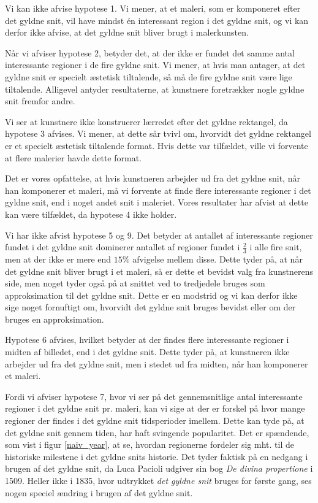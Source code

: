 {Vi kan ikke afvise hypotese 1. Vi mener, at et maleri, som er komponeret
efter det gyldne snit, vil have mindst én interessant region i det
gyldne snit, og vi kan derfor ikke afvise, at det gyldne snit bliver
brugt i malerkunsten.

Når vi afviser hypotese 2, betyder det, at der ikke er fundet det samme
antal interessante regioner i de fire gyldne snit. Vi mener, at hvis man
antager, at det gyldne snit er specielt æstetisk tiltalende, så må de
fire gyldne snit være lige tiltalende. Alligevel antyder resultaterne,
at kunstnere foretrækker nogle gyldne snit fremfor andre.

Vi ser at kunstnere ikke konstruerer lærredet efter det gyldne
rektangel, da hypotese 3 afvises. Vi mener, at dette sår tvivl om,
hvorvidt det gyldne rektangel er et specielt æstetisk tiltalende format.
Hvis dette var tilfældet, ville vi forvente at flere malerier havde
dette format.

Det er vores opfattelse, at hvis kunstneren arbejder ud fra det gyldne
snit, når han komponerer et maleri, må vi forvente at finde flere
interessante regioner i det gyldne snit, end i noget andet snit i
maleriet. Vores resultater har afvist at dette kan være tilfældet, da
hypotese 4 ikke holder.

Vi har ikke afvist hypotese 5 og 9. Det betyder at antallet af
interessante regioner fundet i det gyldne snit dominerer antallet af
regioner fundet i $\frac{2}{3}$ i alle fire snit, men at der ikke er
mere end $15 \%$ afvigelse mellem disse. Dette tyder på, at når det
gyldne snit bliver brugt i et maleri, så er dette et bevidst valg fra
kunstnerens side, men noget tyder også på at snittet ved to tredjedele
bruges som approksimation til det gyldne snit. Dette er en modstrid og
vi kan derfor ikke sige noget fornuftigt om, hvorvidt det gyldne snit
bruges bevidst eller om der bruges en approksimation.

Hypotese 6 afvises, hvilket betyder at der findes flere interessante
regioner i midten af billedet, end i det gyldne snit. Dette tyder på, at
kunstneren ikke arbejder ud fra det gyldne snit, men i stedet ud fra
midten, når han komponerer et maleri.

Fordi vi afviser hypotese 7, hvor vi ser på det gennemsnitlige antal
interessante regioner i det gyldne snit pr. maleri, kan vi sige at der
er forskel på hvor mange regioner der findes i det gyldne snit
tidsperioder imellem.  Dette kan tyde på, at det gyldne snit gennem
tiden, har haft svingende popularitet. Det er spændende, som vist i
figur \ref{naiv_year}, at se, hvordan regionerne fordeler sig mht. til
de historiske milestene i det gyldne snits historie. Det tyder faktisk
på en nedgang i brugen af det gyldne snit, da Luca Pacioli udgiver sin
bog \emph{De divina propertione} i 1509\cite{Markowsky1992}. Heller ikke
i 1835, hvor udtrykket \emph{det gyldne snit} bruges for første
gang\cite{Markowsky1992}, ses nogen speciel ændring i brugen af det
gyldne snit.

}
